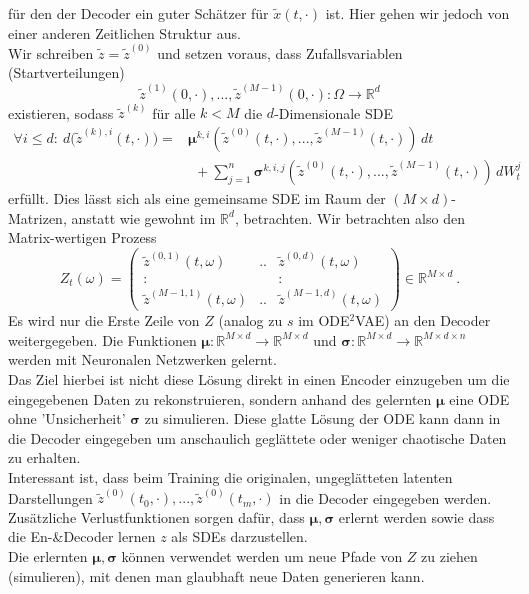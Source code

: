 \documentclass[12pt]{article}
\newcommand{\R}{\mathbb{R}}
\newcommand{\tx}{\widetilde{x}}
\newcommand{\tz}{\widetilde{z}}
\newcommand{\bmu}{\bm{\mu}}
\newcommand{\bsig}{\bm{\sigma}}
\begin{document}
	für den der Decoder ein guter Schätzer für $\tx(t,\cdot)$ ist. Hier gehen wir jedoch von einer anderen Zeitlichen Struktur aus.\\
	Wir schreiben $\tz = \tz^{(0)}$ und setzen voraus, dass Zufallsvariablen (Startverteilungen)
	$$\tz^{(1)}(0,\cdot) ,..., \tz^{(M-1)}(0,\cdot): \Omega \rightarrow \R^d$$
	existieren, sodass $\tz^{(k)}$ für alle $k < M$ die $d$-Dimensionale SDE
	\begin{align*}
	\forall i \leq d: \ d \big(\tz^{(k),i}(t,\cdot)\big) = & \bmu^{k,i}(\tz^{(0)}(t,\cdot),...,\tz^{(M-1)}(t,\cdot)) \, dt\\
	& \ \ + \sum\limits_{j=1}^n \bsig^{k,i,j}(\tz^{(0)}(t,\cdot),...,\tz^{(M-1)}(t,\cdot)) \, dW^j_t
	\end{align*}
	erfüllt. Dies lässt sich als eine gemeinsame SDE im Raum der $(M \times d)$-Matrizen, anstatt wie gewohnt im $\R^d$, betrachten. Wir betrachten also den Matrix-wertigen Prozess
	$$ Z_t(\omega) = \begin{pmatrix}
	\tz^{(0,1)}(t,\omega) & .. & \tz^{(0,d)}(t,\omega)\\
	: & & : \\
	\tz^{(M-1,1)}(t,\omega) & .. & \tz^{(M-1,d)}(t,\omega)
	\end{pmatrix} \in \R^{M \times d} \ .$$
	Es wird nur die Erste Zeile von $Z$ (analog zu $s$ im ODE$^2$VAE) an den Decoder weitergegeben. Die Funktionen $\bmu : \R^{M \times d} \rightarrow \R^{M \times d}$ und $\bsig : \R^{M \times d} \rightarrow \R^{M \times d \times n}$ werden mit Neuronalen Netzwerken gelernt.\\
	Das Ziel hierbei ist nicht diese Lösung direkt in einen Encoder einzugeben um die eingegebenen Daten zu rekonstruieren, sondern anhand des gelernten $\bmu$ eine ODE ohne 'Unsicherheit' $\bsig$ zu simulieren. Diese glatte Lösung der ODE kann dann in die Decoder eingegeben um anschaulich geglättete oder weniger chaotische Daten zu erhalten.\\
	Interessant ist, dass beim Training die originalen, ungeglätteten latenten Darstellungen $\tz^{(0)}(t_0,\cdot),...,\tz^{(0)}(t_m,\cdot)$ in die Decoder eingegeben werden. Zusätzliche Verlustfunktionen sorgen dafür, dass $\bmu, \bsig$ erlernt werden sowie dass die En-\&Decoder lernen $z$ als SDEs darzustellen.\\
	Die erlernten $\bmu,\bsig$ können verwendet werden um neue Pfade von $Z$ zu ziehen (simulieren), mit denen man glaubhaft neue Daten generieren kann.\\
\end{document}

